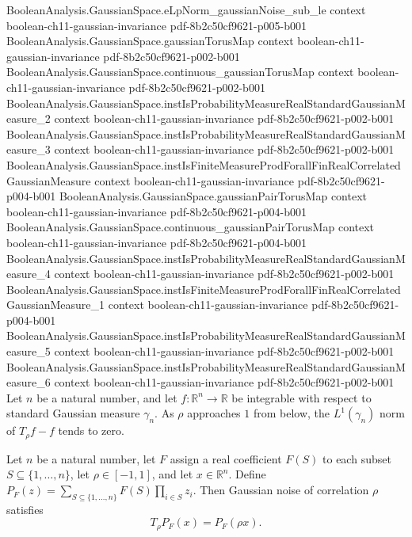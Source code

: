 \begin{theorem}
\proofstep
  {BooleanAnalysis.GaussianSpace.eLpNorm_gaussianNoise_sub_le}
  {context}
  {boolean-ch11-gaussian-invariance}
  {pdf-8b2c50cf9621-p005-b001}
\proofstep
  {BooleanAnalysis.GaussianSpace.gaussianTorusMap}
  {context}
  {boolean-ch11-gaussian-invariance}
  {pdf-8b2c50cf9621-p002-b001}
\proofstep
  {BooleanAnalysis.GaussianSpace.continuous_gaussianTorusMap}
  {context}
  {boolean-ch11-gaussian-invariance}
  {pdf-8b2c50cf9621-p002-b001}
\proofstep
  {BooleanAnalysis.GaussianSpace.instIsProbabilityMeasureRealStandardGaussianMeasure_2}
  {context}
  {boolean-ch11-gaussian-invariance}
  {pdf-8b2c50cf9621-p002-b001}
\proofstep
  {BooleanAnalysis.GaussianSpace.instIsProbabilityMeasureRealStandardGaussianMeasure_3}
  {context}
  {boolean-ch11-gaussian-invariance}
  {pdf-8b2c50cf9621-p002-b001}
\proofstep
  {BooleanAnalysis.GaussianSpace.instIsFiniteMeasureProdForallFinRealCorrelatedGaussianMeasure}
  {context}
  {boolean-ch11-gaussian-invariance}
  {pdf-8b2c50cf9621-p004-b001}
\proofstep
  {BooleanAnalysis.GaussianSpace.gaussianPairTorusMap}
  {context}
  {boolean-ch11-gaussian-invariance}
  {pdf-8b2c50cf9621-p004-b001}
\proofstep
  {BooleanAnalysis.GaussianSpace.continuous_gaussianPairTorusMap}
  {context}
  {boolean-ch11-gaussian-invariance}
  {pdf-8b2c50cf9621-p004-b001}
\proofstep
  {BooleanAnalysis.GaussianSpace.instIsProbabilityMeasureRealStandardGaussianMeasure_4}
  {context}
  {boolean-ch11-gaussian-invariance}
  {pdf-8b2c50cf9621-p002-b001}
\proofstep
  {BooleanAnalysis.GaussianSpace.instIsFiniteMeasureProdForallFinRealCorrelatedGaussianMeasure_1}
  {context}
  {boolean-ch11-gaussian-invariance}
  {pdf-8b2c50cf9621-p004-b001}
\proofstep
  {BooleanAnalysis.GaussianSpace.instIsProbabilityMeasureRealStandardGaussianMeasure_5}
  {context}
  {boolean-ch11-gaussian-invariance}
  {pdf-8b2c50cf9621-p002-b001}
\proofstep
  {BooleanAnalysis.GaussianSpace.instIsProbabilityMeasureRealStandardGaussianMeasure_6}
  {context}
  {boolean-ch11-gaussian-invariance}
  {pdf-8b2c50cf9621-p002-b001}
Let $n$ be a natural number, and let $f:\mathbb R^n\to\mathbb R$ be integrable with
respect to standard Gaussian measure $\gamma_n$. As $\rho$ approaches $1$ from below,
the $L^1(\gamma_n)$ norm of $T_\rho f-f$ tends to zero.
\end{theorem}

\begin{theorem}
\label{BooleanAnalysis.GaussianSpace.gaussianNoise_multilinear}
\leanok
{}
Let $n$ be a natural number, let $F$ assign a real coefficient $F(S)$ to each subset
$S\subseteq\{1,\ldots,n\}$, let $\rho\in[-1,1]$, and let $x\in\mathbb R^n$. Define
$P_F(z)=\sum_{S\subseteq\{1,\ldots,n\}}F(S)\prod_{i\in S}z_i$. Then Gaussian noise of
correlation $\rho$ satisfies
\[T_\rho P_F(x)=P_F(\rho x).\]
\end{theorem}

